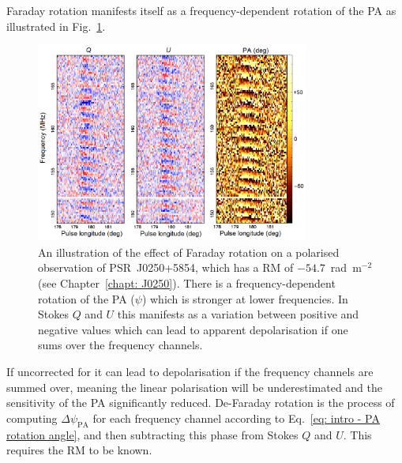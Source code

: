 Faraday rotation manifests itself as a frequency-dependent rotation of the PA as illustrated in Fig.~\ref{fig: intro - RM illustration}.
\begin{figure}
	\centering
	\includegraphics[width=0.8\textwidth]{Figures/Introduction/RM_data}
    \caption[The effect of Faraday rotation on polarisation]{An illustration of the effect of Faraday rotation on a polarised observation of PSR~J0250+5854, which has a RM of $-54.7$~rad~m$^{-2}$ (see Chapter~\ref{chapt: J0250}). There is a frequency-dependent rotation of the PA ($\psi$) which is stronger at lower frequencies. In Stokes $Q$ and $U$ this manifests as a variation between positive and negative values which can lead to apparent depolarisation if one sums over the frequency channels.}
    \label{fig: intro - RM illustration} 
\end{figure}
If uncorrected for it can lead to depolarisation if the frequency channels are summed over, meaning the linear polarisation will be underestimated and the sensitivity of the PA significantly reduced. De-Faraday rotation is the process of computing $\Delta\psi_\mathrm{PA}$ for each frequency channel according to Eq.~\eqref{eq: intro - PA rotation angle}, and then subtracting this phase from Stokes $Q$ and $U$. This requires the RM to be known.


